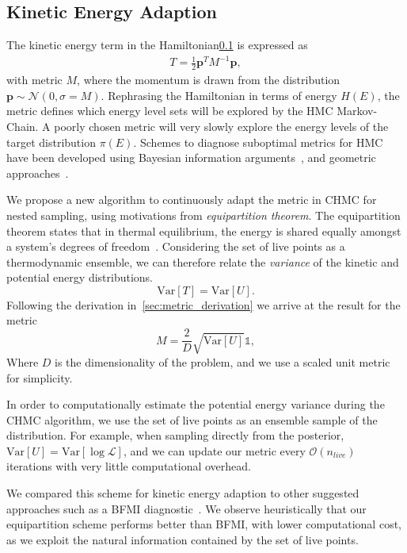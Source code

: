 \documentclass[11pt]{article}
\begin{document}
    \subsection{Kinetic Energy Adaption}
    The kinetic energy term in the Hamiltonian\ref{} is expressed as
    \begin{equation}\label{eq:kinetic_energy}
    \begin{aligned}
        T = \frac{1}{2} \mathbf{p}^T M^{-1} \mathbf{p},
    \end{aligned}
    \end{equation}
    with metric $M$, where the momentum is drawn from the distribution $\mathbf{p} \sim \mathcal{N}(0, \sigma = M)$.
    Rephrasing the Hamiltonian in terms of energy $H(E)$, the metric defines which energy level sets will be explored
    by the HMC Markov-Chain.
    A poorly chosen metric will very slowly explore the energy levels of the target distribution $\pi(E)$.
    Schemes to diagnose suboptimal metrics for HMC have been developed using Bayesian information
    arguments~\cite{betancourt2016energymetric}, and geometric approaches~\cite{bales2019_hmc_metric}.

    We propose a new algorithm to continuously adapt the metric in CHMC for nested sampling, using motivations
    from \emph{equipartition theorem}.
    The equipartition theorem states that in thermal equilibrium, the energy is shared equally amongst a system's degrees
    of freedom~\cite{landau1972theoretical}.
    Considering the set of live points as a thermodynamic ensemble, we can therefore relate the \emph{variance} of the
    kinetic and potential energy distributions.
    \begin{equation}\label{eq:equipartition_theorem}
        \mathrm{Var}[T] = \mathrm{Var}[U].
    \end{equation}
    Following the derivation in~\ref{sec:metric_derivation} we arrive at the result for the metric
    \begin{equation}\label{eq:metric_adaption}
        M = \frac{2}{D} \sqrt{\mathrm{Var}[U]} \mathbb{1},
    \end{equation}
    Where $D$ is the dimensionality of the problem, and we use a scaled unit metric for simplicity.

    In order to computationally estimate the potential energy variance during the CHMC algorithm, we use the
    set of live points as an ensemble sample of the distribution.
    For example, when sampling directly from the posterior, $\mathrm{Var}[U] = \mathrm{Var}[\log{\mathcal{L}}]$,
    and we can update our metric every $\mathcal{O}(n_{live})$ iterations with very little computational overhead.

    We compared this scheme for kinetic energy adaption to other suggested approaches such as a BFMI
    diagnostic~\cite{betancourt2016energymetric}.
    We observe heuristically that our equipartition scheme performs better than BFMI, with lower
    computational cost, as we exploit the natural information contained by the set of live points.
\end{document}
